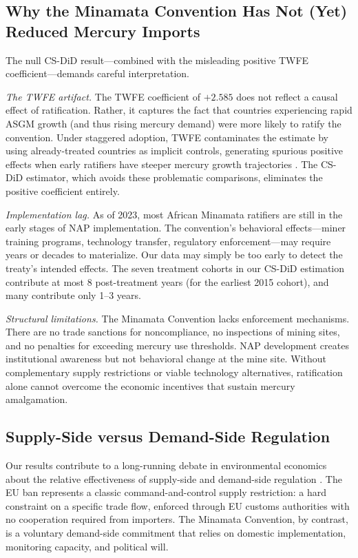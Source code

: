 \documentclass[12pt]{article}
\begin{document}
\subsection{Why the Minamata Convention Has Not (Yet) Reduced Mercury Imports}

The null CS-DiD result---combined with the misleading positive TWFE coefficient---demands careful interpretation.

\textit{The TWFE artifact.} The TWFE coefficient of $+2.585$ does not reflect a causal effect of ratification. Rather, it captures the fact that countries experiencing rapid ASGM growth (and thus rising mercury demand) were more likely to ratify the convention. Under staggered adoption, TWFE contaminates the estimate by using already-treated countries as implicit controls, generating spurious positive effects when early ratifiers have steeper mercury growth trajectories \citep{goodmanbacon2021difference}. The CS-DiD estimator, which avoids these problematic comparisons, eliminates the positive coefficient entirely.

\textit{Implementation lag.} As of 2023, most African Minamata ratifiers are still in the early stages of NAP implementation. The convention's behavioral effects---miner training programs, technology transfer, regulatory enforcement---may require years or decades to materialize. Our data may simply be too early to detect the treaty's intended effects. The seven treatment cohorts in our CS-DiD estimation contribute at most 8 post-treatment years (for the earliest 2015 cohort), and many contribute only 1--3 years.

\textit{Structural limitations.} The Minamata Convention lacks enforcement mechanisms. There are no trade sanctions for noncompliance, no inspections of mining sites, and no penalties for exceeding mercury use thresholds. NAP development creates institutional awareness but not behavioral change at the mine site. Without complementary supply restrictions or viable technology alternatives, ratification alone cannot overcome the economic incentives that sustain mercury amalgamation.

\subsection{Supply-Side versus Demand-Side Regulation}

Our results contribute to a long-running debate in environmental economics about the relative effectiveness of supply-side and demand-side regulation \citep{greenstone2004did}. The EU ban represents a classic command-and-control supply restriction: a hard constraint on a specific trade flow, enforced through EU customs authorities with no cooperation required from importers. The Minamata Convention, by contrast, is a voluntary demand-side commitment that relies on domestic implementation, monitoring capacity, and political will.
\end{document}
